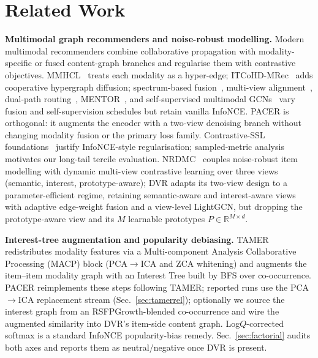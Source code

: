 \documentclass[conference]{IEEEtran}
\newcommand{\dvr}{DVR\xspace}
\begin{document}
\section{Related Work}
\label{sec:related}

\noindent\textbf{Multimodal graph recommenders and noise-robust
modelling.} Modern multimodal recommenders combine collaborative
propagation with modality-specific or fused content-graph branches and
regularise them with contrastive objectives.
MMHCL~\cite{guo2025mmhcl} treats each modality as a hyper-edge;
ITCoHD-MRec~\cite{hao2026itcohd} adds cooperative hypergraph
diffusion; spectrum-based
fusion~\cite{ong2025spectrum,wang2026damps}, multi-view
alignment~\cite{li2026multiview}, dual-path
routing~\cite{yan2025compensating}, MENTOR~\cite{xu2025mentor}, and
self-supervised multimodal GCNs~\cite{kim2024self} vary fusion and
self-supervision schedules but retain vanilla InfoNCE. PACER is
orthogonal: it augments the encoder with a two-view denoising branch
without changing modality fusion or the primary loss family.
Contrastive-SSL foundations~\cite{chen2022intent,liu2021self,liu2023self}
justify InfoNCE-style regularisation; sampled-metric
analysis~\cite{krichene2020sampled} motivates our long-tail tercile
evaluation. NRDMC~\cite{gong2026noise} couples noise-robust item
modelling with dynamic multi-view contrastive learning over three
views (semantic, interest, prototype-aware); \dvr adapts its two-view
design to a parameter-efficient regime, retaining semantic-aware and
interest-aware views with adaptive edge-weight fusion and a view-level
LightGCN, but dropping the prototype-aware view and its $M$ learnable
prototypes $P\in\mathbb{R}^{M\times d}$.

\noindent\textbf{Interest-tree augmentation and popularity debiasing.}
TAMER~\cite{meng2025tamer} redistributes modality features via
a Multi-component Analysis Collaborative Processing (MACP) block
(PCA$\to$ICA and ZCA whitening) and augments the item--item modality
graph with an Interest Tree built by BFS over co-occurrence. PACER
reimplements these steps following TAMER; reported runs use the
PCA$\to$ICA replacement stream (Sec.~\ref{sec:tamerrel});
optionally we source the interest graph from an RSFPGrowth-blended
co-occurrence and wire the augmented similarity into \dvr's
item-side content graph. Log$Q$-corrected softmax is a standard InfoNCE
popularity-bias remedy. Sec.~\ref{sec:factorial} audits both axes
and reports them as neutral/negative once \dvr is present.
\end{document}
